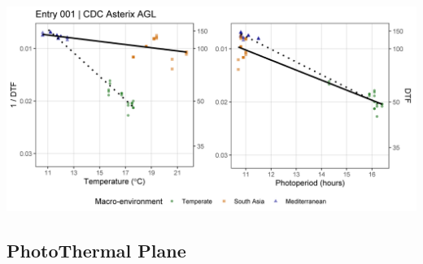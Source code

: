 \documentclass[
]{article}
\begin{document}
\includegraphics{Additional/Entry_TP/TP_Entry_001.png}

\hypertarget{photothermal-plane}{%
\subsection{PhotoThermal Plane}\label{photothermal-plane}}
\end{document}
